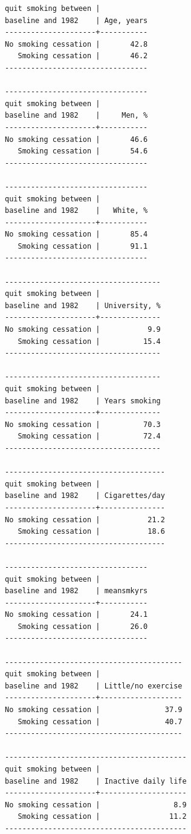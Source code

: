 \documentclass[
  10pt,
]{book}
\begin{document}
\begin{verbatim}
quit smoking between |
baseline and 1982    | Age, years
---------------------+-----------
No smoking cessation |       42.8
   Smoking cessation |       46.2
---------------------------------

---------------------------------
quit smoking between |
baseline and 1982    |     Men, %
---------------------+-----------
No smoking cessation |       46.6
   Smoking cessation |       54.6
---------------------------------

---------------------------------
quit smoking between |
baseline and 1982    |   White, %
---------------------+-----------
No smoking cessation |       85.4
   Smoking cessation |       91.1
---------------------------------

------------------------------------
quit smoking between |
baseline and 1982    | University, %
---------------------+--------------
No smoking cessation |           9.9
   Smoking cessation |          15.4
------------------------------------

------------------------------------
quit smoking between |
baseline and 1982    | Years smoking
---------------------+--------------
No smoking cessation |          70.3
   Smoking cessation |          72.4
------------------------------------

-------------------------------------
quit smoking between |
baseline and 1982    | Cigarettes/day
---------------------+---------------
No smoking cessation |           21.2
   Smoking cessation |           18.6
-------------------------------------

---------------------------------
quit smoking between |
baseline and 1982    | meansmkyrs
---------------------+-----------
No smoking cessation |       24.1
   Smoking cessation |       26.0
---------------------------------

-----------------------------------------
quit smoking between |
baseline and 1982    | Little/no exercise
---------------------+-------------------
No smoking cessation |               37.9
   Smoking cessation |               40.7
-----------------------------------------

------------------------------------------
quit smoking between |
baseline and 1982    | Inactive daily life
---------------------+--------------------
No smoking cessation |                 8.9
   Smoking cessation |                11.2
------------------------------------------
\end{verbatim}
\end{document}
